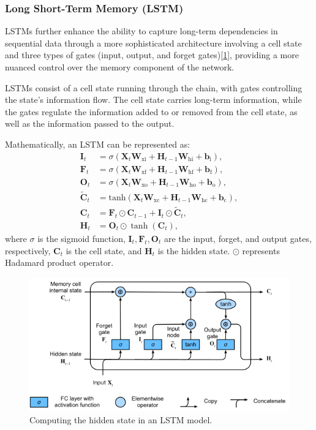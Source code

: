 \documentclass[10pt,twocolumn,letterpaper]{article}
\begin{document}
\subsubsection{Long Short-Term Memory (LSTM)}
\label{sec:lstm}
LSTMs further enhance the ability to capture long-term dependencies in sequential data through a more sophisticated architecture involving a cell state and three types of gates (input, output, and forget gates)\cite{memory2010long, yu2019review}[\ref{fig:lstm}], providing a more nuanced control over the memory component of the network.

LSTMs consist of a cell state running through the chain, with gates controlling the state's information flow. The cell state carries long-term information, while the gates regulate the information added to or removed from the cell state, as well as the information passed to the output.

Mathematically, an LSTM can be represented as:
\begin{align*}
	\mathbf{I}_t &= \sigma(\mathbf{X}_t \mathbf{W}_{\textrm{xi}} + \mathbf{H}_{t-1} \mathbf{W}_{\textrm{hi}} + \mathbf{b}_\textrm{i}),\\
	\mathbf{F}_t &= \sigma(\mathbf{X}_t \mathbf{W}_{\textrm{xf}} + \mathbf{H}_{t-1} \mathbf{W}_{\textrm{hf}} + \mathbf{b}_\textrm{f}),\\
	\mathbf{O}_t &= \sigma(\mathbf{X}_t \mathbf{W}_{\textrm{xo}} + \mathbf{H}_{t-1} \mathbf{W}_{\textrm{ho}} + \mathbf{b}_\textrm{o}), \\
	\tilde{\mathbf{C}}_t &= \textrm{tanh}(\mathbf{X}_t \mathbf{W}_{\textrm{xc}} + \mathbf{H}_{t-1} \mathbf{W}_{\textrm{hc}} + \mathbf{b}_\textrm{c}),\\
	\mathbf{C}_t &= \mathbf{F}_t \odot \mathbf{C}_{t-1} + \mathbf{I}_t \odot \tilde{\mathbf{C}}_t,\\
	\mathbf{H}_t &= \mathbf{O}_t \odot \tanh(\mathbf{C}_t),
\end{align*}
where \( \sigma \) is the sigmoid function, \( \mathbf{I}_t, \mathbf{F}_t, \mathbf{O}_t \) are the input, forget, and output gates, respectively, \( \mathbf{C}_t \) is the cell state, and \( \mathbf{H}_t \) is the hidden state.  \( \odot \) represents Hadamard product operator.
\begin{figure}[h]
	\centering
	\includegraphics[width=\columnwidth]{lstm}
	\caption{Computing the hidden state in an LSTM model\cite{zhang2023dive}.}
	\label{fig:lstm}
\end{figure}
\end{document}
